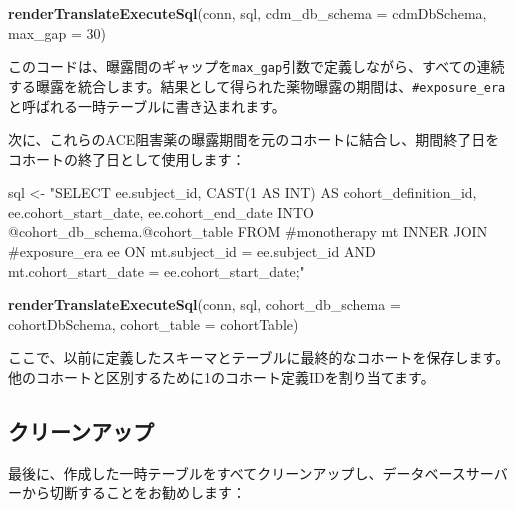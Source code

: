 \documentclass[
  11pt]{book}
\newenvironment{Shaded}{\begin{snugshade}}{\end{snugshade}}
\newcommand{\AttributeTok}[1]{\textcolor[rgb]{0.13,0.29,0.53}{#1}}
\newcommand{\DecValTok}[1]{\textcolor[rgb]{0.00,0.00,0.81}{#1}}
\newcommand{\FunctionTok}[1]{\textcolor[rgb]{0.13,0.29,0.53}{\textbf{#1}}}
\newcommand{\NormalTok}[1]{#1}
\newcommand{\OtherTok}[1]{\textcolor[rgb]{0.56,0.35,0.01}{#1}}
\newcommand{\StringTok}[1]{\textcolor[rgb]{0.31,0.60,0.02}{#1}}
\theoremstyle{definition}
\theoremstyle{definition}
\theoremstyle{definition}
\theoremstyle{definition}
\theoremstyle{remark}
\begin{document}
\begin{Shaded}
\begin{Highlighting}[]
\FunctionTok{renderTranslateExecuteSql}\NormalTok{(conn,}
\NormalTok{                          sql,}
                          \AttributeTok{cdm\_db\_schema =}\NormalTok{ cdmDbSchema,}
                          \AttributeTok{max\_gap =} \DecValTok{30}\NormalTok{)}
\end{Highlighting}
\end{Shaded}

このコードは、曝露間のギャップを\texttt{max\_gap}引数で定義しながら、すべての連続する曝露を統合します。結果として得られた薬物曝露の期間は、\texttt{\#exposure\_era}と呼ばれる一時テーブルに書き込まれます。

次に、これらのACE阻害薬の曝露期間を元のコホートに結合し、期間終了日をコホートの終了日として使用します：

\begin{Shaded}
\begin{Highlighting}[]
\NormalTok{sql }\OtherTok{\textless{}{-}} \StringTok{"SELECT ee.subject\_id,}
\StringTok{  CAST(1 AS INT) AS cohort\_definition\_id,}
\StringTok{  ee.cohort\_start\_date,}
\StringTok{  ee.cohort\_end\_date}
\StringTok{INTO @cohort\_db\_schema.@cohort\_table}
\StringTok{FROM \#monotherapy mt}
\StringTok{INNER JOIN \#exposure\_era ee}
\StringTok{  ON mt.subject\_id = ee.subject\_id}
\StringTok{    AND mt.cohort\_start\_date = ee.cohort\_start\_date;"}

\FunctionTok{renderTranslateExecuteSql}\NormalTok{(conn,}
\NormalTok{                          sql,}
                          \AttributeTok{cohort\_db\_schema =}\NormalTok{ cohortDbSchema,}
                          \AttributeTok{cohort\_table =}\NormalTok{ cohortTable)}
\end{Highlighting}
\end{Shaded}

ここで、以前に定義したスキーマとテーブルに最終的なコホートを保存します。他のコホートと区別するために1のコホート定義IDを割り当てます。

\subsection{クリーンアップ}\label{ux30afux30eaux30fcux30f3ux30a2ux30c3ux30d7-1}

最後に、作成した一時テーブルをすべてクリーンアップし、データベースサーバーから切断することをお勧めします：
\end{document}
